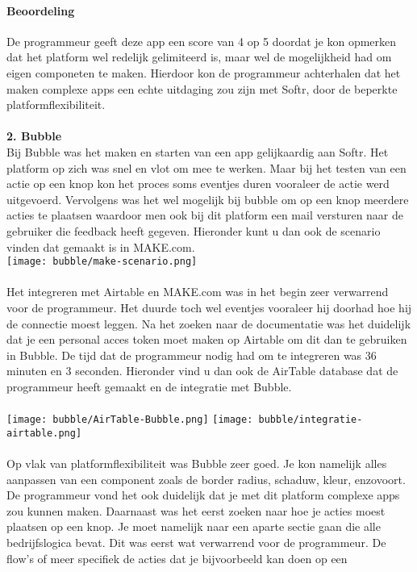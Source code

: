 \paragraph*{Beoordeling}
De programmeur geeft deze app een score van 4 op 5 doordat je kon opmerken dat het platform wel redelijk gelimiteerd is, maar wel de mogelijkheid had om eigen componeten te maken. 
Hierdoor kon de programmeur achterhalen dat het maken complexe apps een echte uitdaging zou zijn met Softr, 
door de beperkte platformflexibiliteit.
\\
\\
\textbf{2. Bubble}
\\
Bij Bubble was het maken en starten van een app gelijkaardig aan Softr. Het platform op zich was snel en vlot om mee te werken. Maar bij het testen van een actie op een knop
kon het proces soms eventjes duren vooraleer de actie werd uitgevoerd. Vervolgens was het wel mogelijk bij bubble om op een knop meerdere acties te plaatsen waardoor men ook 
bij dit platform een mail versturen naar de gebruiker die feedback heeft gegeven. Hieronder kunt u dan ook de scenario vinden dat gemaakt is in MAKE.com.
\\
\texttt{[image: bubble/make-scenario.png]}
\\
\\
Het integreren met Airtable en MAKE.com was in het begin zeer verwarrend voor de programmeur. Het duurde toch wel eventjes vooraleer hij doorhad hoe hij de connectie moest leggen.
Na het zoeken naar de documentatie was het duidelijk dat je een personal acces token moet maken op Airtable om dit dan te gebruiken in Bubble. De tijd dat de programmeur nodig had 
om te integreren was 36 minuten en 3 seconden. Hieronder vind u dan ook de AirTable database dat de programmeur heeft gemaakt en de integratie met Bubble.
\\
\\
\texttt{[image: bubble/AirTable-Bubble.png]}
\texttt{[image: bubble/integratie-airtable.png]}
\\
\\
Op vlak van platformflexibiliteit was Bubble zeer goed. Je kon namelijk alles aanpassen van een component zoals de border radius, schaduw, kleur, enzovoort. 
De programmeur vond het ook duidelijk dat je met dit platform complexe apps zou kunnen maken. Daarnaast was het eerst zoeken naar hoe je acties moest plaatsen op een knop.
Je moet namelijk naar een aparte sectie gaan die alle bedrijfslogica bevat. Dit was eerst wat verwarrend voor de programmeur. De flow's of meer specifiek de acties dat je bijvoorbeeld kan doen op een 
